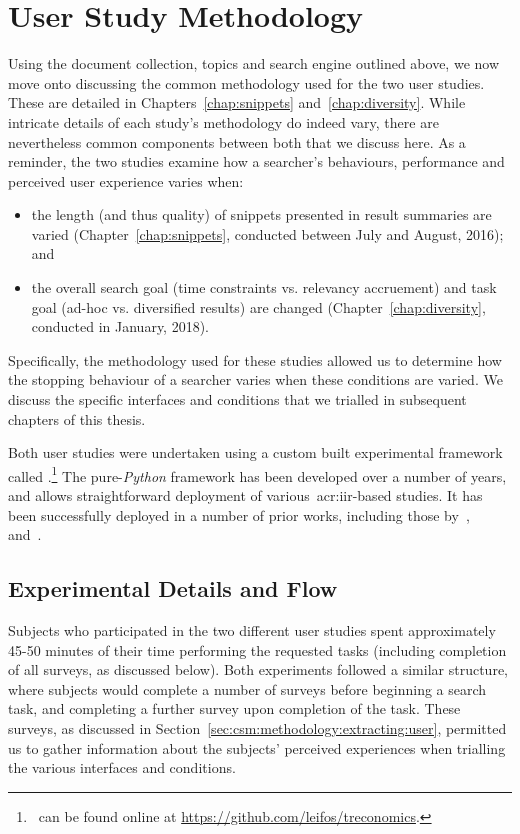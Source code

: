 \section{User Study Methodology}\label{sec:method:user_study}
Using the document collection, topics and search engine outlined above, we now move onto discussing the common methodology used for the two user studies. These are detailed in Chapters~\ref{chap:snippets} and~\ref{chap:diversity}. While intricate details of each study's methodology do indeed vary, there are nevertheless common components between both that we discuss here. As a reminder, the two studies examine how a searcher's behaviours, performance and perceived user experience varies when:

\begin{itemize}
    \item{the length (and thus quality) of snippets presented in result summaries are varied (Chapter~\ref{chap:snippets}, conducted between July and August, 2016); and}
    
    \item{the overall search goal (time constraints vs. relevancy accruement) and task goal (ad-hoc vs. diversified results) are changed (Chapter~\ref{chap:diversity}, conducted in January, 2018).}
\end{itemize}

Specifically, the methodology used for these studies allowed us to determine how the stopping behaviour of a searcher varies when these conditions are varied. We discuss the specific interfaces and conditions that we trialled in subsequent chapters of this thesis.

Both user studies were undertaken using a custom built experimental framework called .\footnote{\treconomics~can be found online at \url{https://github.com/leifos/treconomics}. } The pure-\emph{Python} framework has been developed over a number of years, and allows straightforward deployment of various~\gls{acr:iir}-based studies. It has been successfully deployed in a number of prior works, including those by~\cite{azzopardi2013query_cost},~\cite{maxwell2014temporal_delays} and~\cite{kelly2015serp_size}.

\subsection{Experimental Details and Flow}\label{sec:csm:methodology:user:flow}
Subjects who participated in the two different user studies spent approximately 45-50 minutes of their time performing the requested tasks (including completion of all surveys, as discussed below). Both experiments followed a similar structure, where subjects would complete a number of surveys before beginning a search task, and completing a further survey upon completion of the task. These surveys, as discussed in Section~\ref{sec:csm:methodology:extracting:user}, permitted us to gather information about the subjects' perceived experiences when trialling the various interfaces and conditions.

